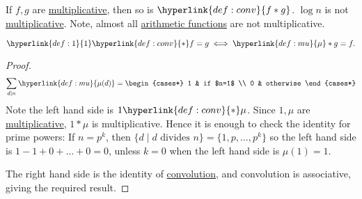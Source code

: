 \documentclass{article}
\begin{document}
\begin{fact}
  If $f,g$ are \hyperlink{def:multi}{multiplicative}, then so is $\hyperlink{def:conv}{f*g}$.
  $\log n $ is not \hyperlink{def:multi}{multiplicative}.
  Note, almost all \hyperlink{def:arith}{arithmetic functions} are not multiplicative.
\end{fact}
\begin{lemma}
  \begin{equation*}
    \hyperlink{def:1}{1} \hyperlink{def:conv}{*} f = g \iff \hyperlink{def:mu}{\mu} * g = f.
  \end{equation*}
\end{lemma}

\begin{proof}
  \begin{equation*}
    \sum_{d \mid n} \hyperlink{def:mu}{\mu(d)} =
    \begin{cases*}
      1 & if $n=1$ \\
      0 & otherwise
    \end{cases*}
  \end{equation*}
  Note the left hand side is $1\hyperlink{def:conv}{*}\mu$.
  Since $1,\mu$ are \hyperlink{def:multi}{multiplicative}, $1*\mu$ is multiplicative.
  Hence it is enough to check the identity for prime powers:
  If $n= p^k$, then $\{d \mid d\text{ divides }n\} = \{1,p,\ldots,p^k\}$ so the left hand side is $1-1 + 0 + \ldots + 0 = 0$, unless $k=0$ when the left hand side is $\mu(1) =1$.

  The right hand side is the identity of \hyperlink{def:conv}{convolution}, and convolution is associative, giving the required result.
\end{proof}
\end{document}
